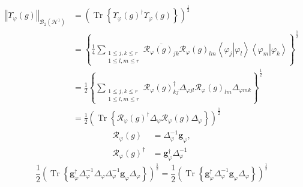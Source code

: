 \documentclass[aps,preprint]{revtex4}%
\begin{document}
\begin{align}
\left\Vert \Upsilon_{\varphi}\left(  g\right)  \right\Vert _{\mathcal{B}%
_{2}\left(  \mathcal{H}^{1}\right)  }  &  =\left(  \operatorname*{Tr}\left\{
\Upsilon_{\varphi}\left(  g\right)  ^{\dagger}\Upsilon_{\varphi}\left(
g\right)  \right\}  \right)  ^{\frac{1}{2}}\\
&  =\left\{  \frac{1}{4}\sum_{\substack{1\leq j,k\leq r\\1\leq l,m\leq
r}}\overline{\mathcal{R}_{\varphi}\left(  g\right)  _{jk}}\mathcal{R}%
_{\varphi}\left(  g\right)  _{lm}\left\langle \left.  \varphi_{j}\right\vert
\varphi_{l}\right\rangle \left\langle \left.  \varphi_{m}\right\vert
\varphi_{k}\right\rangle \right\}  ^{\frac{1}{2}}\\
&  =\frac{1}{2}\left\{  \sum_{\substack{1\leq j,k\leq r\\1\leq l,m\leq
r}}\mathcal{R}_{\varphi}\left(  g\right)  _{kj}^{\dagger}\Delta_{\varphi
jl}\mathcal{R}_{\varphi}\left(  g\right)  _{lm}\Delta_{\varphi mk}\right\}
^{\frac{1}{2}}\\
&  =\frac{1}{2}\left(  \operatorname*{Tr}\left\{  \mathcal{R}_{\varphi}\left(
g\right)  ^{\dagger}\Delta_{\varphi}\mathcal{R}_{\varphi}\left(  g\right)
\Delta_{\varphi}\right\}  \right)  ^{\frac{1}{2}}%
\end{align}%
\begin{align}
\mathcal{R}_{\varphi}\left(  g\right)   &  =\Delta_{\varphi}^{-1}%
\mathbf{g}_{\varphi},\\
\mathcal{R}_{\varphi}\left(  g\right)  ^{\dagger}  &  =\mathbf{g}_{\varphi
}^{\dagger}\Delta_{\varphi}^{-1}%
\end{align}%
\begin{equation}
\frac{1}{2}\left(  \operatorname*{Tr}\left\{  \mathbf{g}_{\varphi}^{\dagger
}\Delta_{\varphi}^{-1}\Delta_{\varphi}\Delta_{\varphi}^{-1}\mathbf{g}%
_{\varphi}\Delta_{\varphi}\right\}  \right)  ^{\frac{1}{2}}=\frac{1}{2}\left(
\operatorname*{Tr}\left\{  \mathbf{g}_{\varphi}^{\dagger}\Delta_{\varphi}%
^{-1}\mathbf{g}_{\varphi}\Delta_{\varphi}\right\}  \right)  ^{\frac{1}{2}}%
\end{equation}
\end{document}
